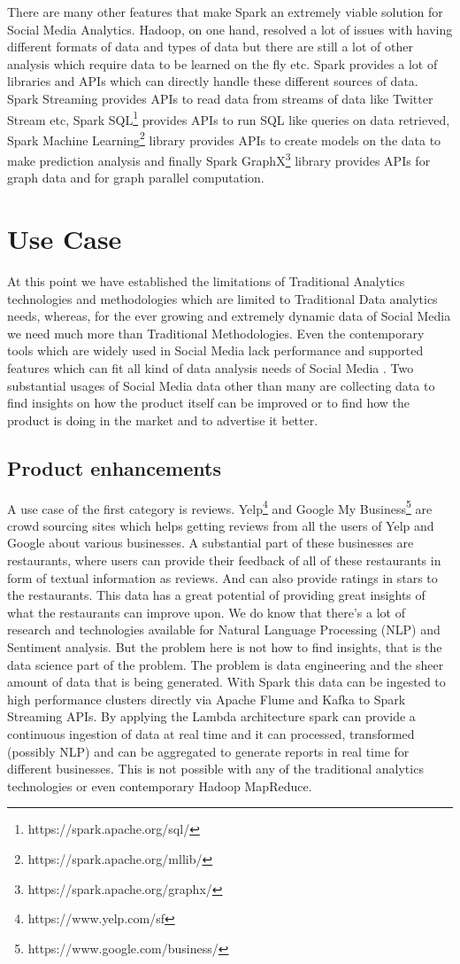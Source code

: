 \documentclass[sigconf]{acmart}
\begin{document}
There are many other features that make Spark an extremely viable solution for Social Media Analytics. Hadoop, on one hand, resolved a lot of issues with having different formats of data and types of data but there are still a lot of other analysis which require data to be learned on the fly etc. Spark provides a lot of libraries and APIs which can directly handle these different sources of data. Spark Streaming provides APIs to read data from streams of data like Twitter Stream etc, Spark SQL\footnote{https://spark.apache.org/sql/} provides APIs to run SQL like queries on data retrieved, Spark Machine Learning\footnote{https://spark.apache.org/mllib/} library provides APIs to create models on the data to make prediction analysis and finally Spark GraphX\footnote{https://spark.apache.org/graphx/} library provides APIs for graph data and for graph parallel computation.
\section{Use Case}
At this point we have established the limitations of Traditional Analytics technologies and methodologies which are limited to Traditional Data analytics needs, whereas, for the ever growing and extremely dynamic data of Social Media we need much more than Traditional Methodologies. Even the contemporary tools which are widely used in Social Media lack performance and supported features which can fit all kind of data analysis needs of Social Media \cite{krishnan}. Two substantial usages of Social Media data other than many are collecting data to find insights on how the product itself can be improved or to find how the product is doing in the market and to advertise it better.
\subsection{Product enhancements}
A use case of the first category is reviews. Yelp\footnote{https://www.yelp.com/sf} and Google My Business\footnote{https://www.google.com/business/} are crowd sourcing sites which helps getting reviews from all the users of Yelp and Google about various businesses. A substantial part of these businesses are restaurants, where users can provide their feedback of all of these restaurants in form of textual information as reviews. And can also provide ratings in stars to the restaurants. This data has a great potential of providing great insights of what the restaurants can improve upon. We do know that there's a lot of research and technologies available for Natural Language Processing (NLP) and Sentiment analysis. But the problem here is not how to find insights, that is the data science part of the problem. The problem is data engineering and the sheer amount of data that is being generated. With Spark this data can be ingested to high performance clusters directly via Apache Flume and Kafka to Spark Streaming APIs. By applying the Lambda architecture \cite{lambdaspark} spark can provide a continuous ingestion of data at real time and it can processed, transformed (possibly NLP) and can be aggregated to generate reports in real time for different businesses. This is not possible with any of the traditional analytics technologies or even contemporary Hadoop MapReduce.
\end{document}
